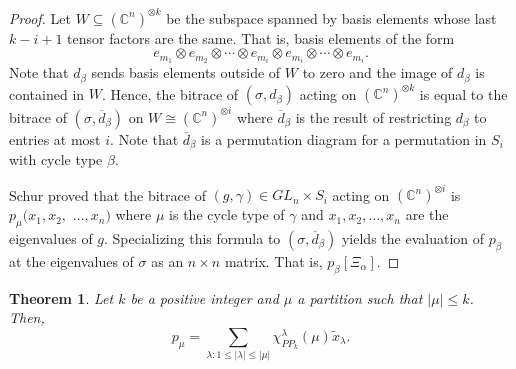 \documentclass{amsart}
\newtheorem{theorem}[lemma]{Theorem}
\theoremstyle{definition}
\newcommand{\C}{\mathbb{C}}
\newcommand{\PP}{P\!P}
\newcommand{\ov}[1]{\overline{#1}}
\begin{document}
\begin{proof}
	Let $W\subseteq \left(\C^n\right)^{\otimes k}$ be the subspace spanned by basis elements whose last $k-i+1$ tensor factors are the same.
	That is, basis elements of the form \[e_{m_1}\otimes e_{m_2}\otimes\cdots\otimes e_{m_i}\otimes e_{m_i}\otimes \cdots \otimes e_{m_i}.\]
	Note that $d_\beta$ sends basis elements outside of $W$ to zero and the image of $d_\beta$ is contained in $W$.
	Hence, the bitrace of $(\sigma,d_\beta)$ acting on $\left(\C^n\right)^{\otimes k}$ is equal to the bitrace of $(\sigma,\ov{d}_\beta)$ on $W\cong\left(\C^n\right)^{\otimes i}$ where $\ov{d}_\beta$ is the result of restricting $d_\beta$ to entries at most $i$. Note that $\ov{d}_\beta$ is a permutation diagram for a permutation in $S_i$ with cycle type $\beta$.
	
	Schur proved that the bitrace of $(g,\gamma)\in GL_n\times S_i$ acting on $\left(\C^n\right)^{\otimes i}$ is $p_\mu(x_1,x_2,$ $\ldots,x_n)$ where $\mu$ is the cycle type of $\gamma$ and $x_1,x_2,\ldots,x_n$ are the eigenvalues of $g$.
	Specializing this formula to $(\sigma,\ov{d}_\beta)$ yields the evaluation of $p_\beta$ at the eigenvalues of $\sigma$ as an $n\times n$ matrix. That is, $p_\beta[\Xi_\alpha]$.
\end{proof}

\begin{theorem} \label{thm:power_sum_character}
Let $k$ be a positive integer and $\mu$ a partition such that $|\mu|\leq k$. Then,
\[
p_\mu = \sum_{\lambda : 1 \leq |\lambda| \leq |\mu|} \chi^\lambda_{\PP_k}(\mu) \tilde{x}_\lambda.
\]
\end{theorem}
\end{document}
